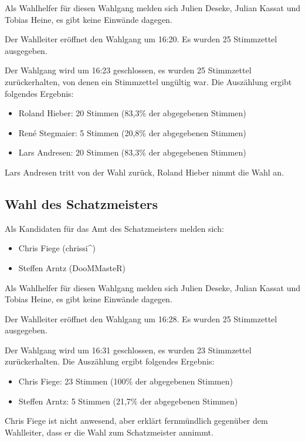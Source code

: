 \documentclass[a4paper,12pt]{scrartcl}
\begin{document}
Als Wahlhelfer für diesen Wahlgang melden sich Julien Deseke, Julian Kassat und
Tobias Heine, es gibt keine Einwände dagegen.

Der Wahlleiter eröffnet den Wahlgang um 16:20. Es wurden 25 Stimmzettel
ausgegeben.

Der Wahlgang wird um 16:23 geschlossen, es wurden 25 Stimmzettel zurückerhalten,
von denen ein Stimmzettel ungültig war. Die Auszählung ergibt folgendes
Ergebnis:

\begin{itemize}
  \item Roland Hieber: 20 Stimmen (83{,}3\% der abgegebenen Stimmen)
  \item René Stegmaier: 5 Stimmen (20{,}8\% der abgegebenen Stimmen)
  \item Lars Andresen: 20 Stimmen (83{,}3\% der abgegebenen Stimmen)
\end{itemize}

Lars Andresen tritt von der Wahl zurück, Roland Hieber nimmt die Wahl an.

\subsection{Wahl des Schatzmeisters}
Als Kandidaten für das Amt des Schatzmeisters melden sich:
\begin{itemize}
  \item Chris Fiege (chrissi\textasciicircum)
  \item Steffen Arntz (DooMMasteR)
\end{itemize}

Als Wahlhelfer für diesen Wahlgang melden sich Julien Deseke, Julian Kassat und
Tobias Heine, es gibt keine Einwände dagegen.

Der Wahlleiter eröffnet den Wahlgang um 16:28. Es wurden 25 Stimmzettel
ausgegeben.

Der Wahlgang wird um 16:31 geschlossen, es wurden 23 Stimmzettel zurückerhalten.
Die Auszählung ergibt folgendes Ergebnis:

\begin{itemize}
  \item Chris Fiege: 23 Stimmen (100\% der abgegebenen Stimmen)
  \item Steffen Arntz: 5 Stimmen (21{,}7\% der abgegebenen Stimmen)
\end{itemize}

Chris Fiege ist nicht anwesend, aber erklärt fernmündlich gegenüber dem
Wahlleiter, dass er die Wahl zum Schatzmeister annimmt.
\end{document}
